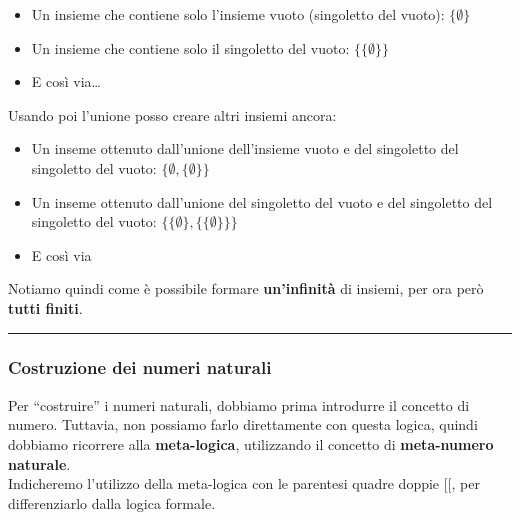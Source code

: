 \documentclass[
  a4paper,
]{article}
\providecommand{\tightlist}{%
  \setlength{\itemsep}{0pt}\setlength{\parskip}{0pt}}
\begin{document}
\begin{itemize}
\tightlist
\item
  Un insieme che contiene solo l'insieme vuoto (singoletto del vuoto):
  \(\{\emptyset\}\)
\item
  Un insieme che contiene solo il singoletto del vuoto:
  \(\{\{\emptyset\}\}\)
\item
  E così via\ldots{}
\end{itemize}

Usando poi l'unione posso creare altri insiemi ancora:

\begin{itemize}
\tightlist
\item
  Un inseme ottenuto dall'unione dell'insieme vuoto e del singoletto del
  singoletto del vuoto: \(\{\emptyset , \{\emptyset\}\}\)
\item
  Un inseme ottenuto dall'unione del singoletto del vuoto e del
  singoletto del singoletto del vuoto:
  \(\{\{\emptyset\} , \{\{\emptyset\}\}\}\)\\
\item
  E così via
\end{itemize}

Notiamo quindi come è possibile formare \textbf{un'infinità} di insiemi,
per ora però \textbf{tutti finiti}.

\par\noindent\rule{\linewidth}{0.4pt}\par\vspace{6pt}

\hypertarget{costruzione-dei-numeri-naturali}{%
\subsubsection{Costruzione dei numeri
naturali}\label{costruzione-dei-numeri-naturali}}

Per ``costruire'' i numeri naturali, dobbiamo prima introdurre il
concetto di numero. Tuttavia, non possiamo farlo direttamente con questa
logica, quindi dobbiamo ricorrere alla \textbf{meta-logica}, utilizzando
il concetto di \textbf{meta-numero naturale}.\\
Indicheremo l'utilizzo della meta-logica con le parentesi quadre doppie
\([[\), per differenziarlo dalla logica formale.
\end{document}
